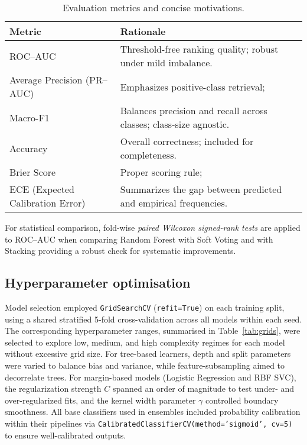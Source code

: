 \documentclass[conference]{IEEEtran}
\begin{document}
\begin{table}[h]
\centering
\footnotesize
\setlength{\tabcolsep}{3pt}
\caption{Evaluation metrics and concise motivations.}
\label{tab:metrics}
\begin{tabularx}{\columnwidth}{l X}
\toprule
\textbf{Metric} & \textbf{Rationale} \\
\midrule
ROC--AUC & Threshold-free ranking quality; robust under mild imbalance. \\
Average Precision (PR--AUC) & Emphasizes positive-class retrieval; \\
Macro-F1 & Balances precision and recall across classes; class-size agnostic. \\
Accuracy & Overall correctness; included for completeness. \\
Brier Score & Proper scoring rule; \\
ECE (Expected Calibration Error) & Summarizes the gap between predicted and empirical frequencies. \\
\bottomrule
\end{tabularx}
\end{table}

For statistical comparison, fold-wise \emph{paired Wilcoxon signed-rank tests} are applied to ROC--AUC when comparing Random Forest with Soft Voting and with Stacking providing a robust check for systematic improvements.


\subsection{Hyperparameter optimisation}
Model selection employed \texttt{GridSearchCV} (\texttt{refit{=}True}) on each training split, using a shared stratified 5-fold cross-validation across all models within each seed. The corresponding hyperparameter ranges, summarised in Table~\ref{tab:grids}, were selected to explore low, medium, and high complexity regimes for each model without excessive grid size. For tree-based learners, depth and split parameters were varied to balance bias and variance, while feature-subsampling aimed to decorrelate trees. For margin-based models (Logistic Regression and RBF SVC), the regularization strength $C$ spanned an order of magnitude to test under- and over-regularized fits, and the kernel width parameter $\gamma$ controlled boundary smoothness. All base classifiers used in ensembles included probability calibration within their pipelines via \texttt{CalibratedClassifierCV(method='sigmoid', cv=5)} to ensure well-calibrated outputs.
\end{document}
